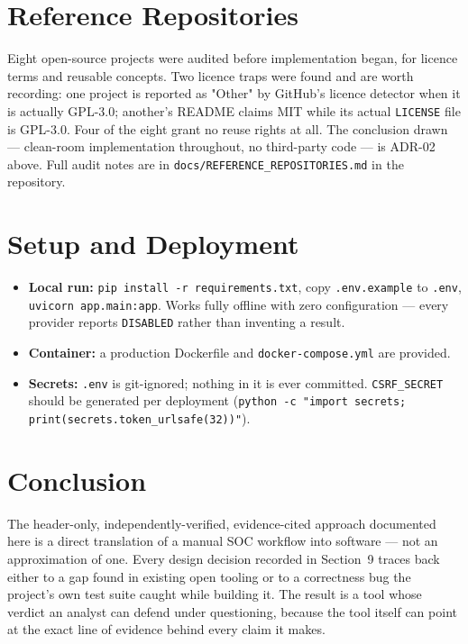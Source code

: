 \documentclass[11pt,a4paper]{article}
\begin{document}
\section{Reference Repositories}
\label{sec:reference}

Eight open-source projects were audited before implementation began, for licence terms and
reusable concepts. Two licence traps were found and are worth recording: one project is
reported as "Other" by GitHub's licence detector when it is actually GPL-3.0; another's README
claims MIT while its actual \texttt{LICENSE} file is GPL-3.0. Four of the eight grant no reuse
rights at all. The conclusion drawn — clean-room implementation throughout, no third-party
code — is ADR-02 above. Full audit notes are in \texttt{docs/REFERENCE\_REPOSITORIES.md} in
the repository.

\section{Setup and Deployment}

\begin{itemize}[leftmargin=1.4em]
  \item \textbf{Local run:} \texttt{pip install -r requirements.txt}, copy \texttt{.env.example}
    to \texttt{.env}, \texttt{uvicorn app.main:app}. Works fully offline with zero
    configuration — every provider reports \texttt{DISABLED} rather than inventing a result.
  \item \textbf{Container:} a production Dockerfile and \texttt{docker-compose.yml} are
    provided.
  \item \textbf{Secrets:} \texttt{.env} is git-ignored; nothing in it is ever committed.
    \texttt{CSRF\_SECRET} should be generated per deployment
    (\texttt{python -c "import secrets; print(secrets.token\_urlsafe(32))"}).
\end{itemize}

\section{Conclusion}

The header-only, independently-verified, evidence-cited approach documented here is a direct
translation of a manual SOC workflow into software — not an approximation of one. Every design
decision recorded in Section~9 traces back either to a gap found in existing open tooling or to
a correctness bug the project's own test suite caught while building it. The result is a tool
whose verdict an analyst can defend under questioning, because the tool itself can point at the
exact line of evidence behind every claim it makes.
\end{document}
